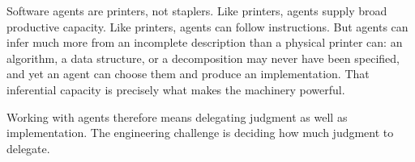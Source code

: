 Software agents are printers, not staplers. Like printers, agents supply broad productive capacity. Like printers, agents can follow instructions. But agents can infer much more from an incomplete description than a physical printer can: an algorithm, a data structure, or a decomposition may never have been specified, and yet an agent can choose them and produce an implementation. That inferential capacity is precisely what makes the machinery powerful.


Working with agents therefore means delegating judgment as well as implementation. The engineering challenge is deciding how much judgment to delegate.
